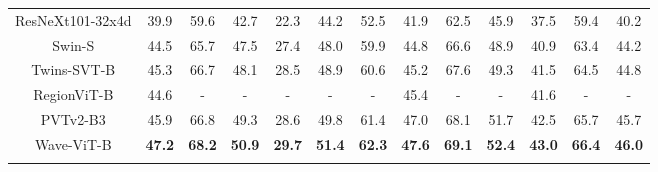 \documentclass[runningheads]{llncs}
\begin{document}
\begin{table*}[!tb]
\begin{tabular}{c|cccccc|cccccc}
ResNeXt101-32x4d  \cite{xie2017aggregated}   & 39.9 & 59.6 & 42.7 & 22.3 & 44.2 & 52.5 & 41.9 & 62.5  & 45.9  & 37.5 & 59.4  & 40.2  \\
Swin-S \cite{liu2021swin}                    & 44.5 & 65.7 & 47.5 & 27.4 & 48.0 & 59.9 & 44.8 & 66.6  & 48.9  & 40.9 & 63.4  & 44.2  \\
Twins-SVT-B \cite{chu2021twins}              & 45.3 & 66.7 & 48.1 & 28.5 & 48.9 & 60.6 & 45.2 & 67.6  & 49.3  & 41.5 & 64.5  & 44.8  \\
RegionViT-B \cite{chen2021regionvit}         & 44.6 & -    & -    & -    & -    & -    & 45.4 & -     & -     & 41.6 & -     & -     \\
PVTv2-B3  \cite{wang2021pvtv2}               & 45.9 & 66.8 & 49.3 & 28.6 & 49.8 & 61.4 & 47.0 & 68.1  & 51.7  & 42.5 & 65.7  & 45.7  \\
Wave-ViT-B                                   & \textbf{47.2} & \textbf{68.2} & \textbf{50.9} & \textbf{29.7} & \textbf{51.4} & \textbf{62.3} & \textbf{47.6} & \textbf{69.1}  & \textbf{52.4}  & \textbf{43.0} & \textbf{66.4}  & \textbf{46.0}  \\ \Xhline{2\arrayrulewidth}
\end{tabular}
\label{table:od}
\vspace{-0.1in}
\end{table*}
\end{document}

